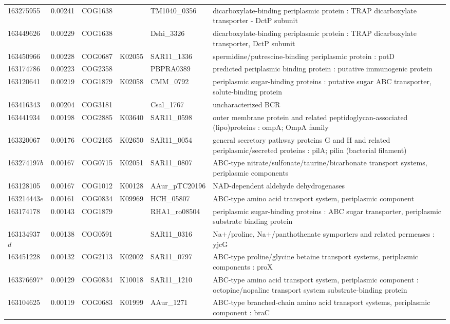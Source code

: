 \begin{landscape}
\begin{longtable}{p{1.8cm}p{0.9cm}p{2.2cm}p{1cm}p{2.8cm}p{13.4cm}}
163275955&0.00241&COG1638&&TM1040\_0356&dicarboxylate-binding periplasmic protein : TRAP dicarboxylate transporter - DctP subunit \\
163449626&0.00229&COG1638&&Dshi\_3326&dicarboxylate-binding periplasmic protein : TRAP dicarboxylate transporter, DctP subunit \\
163450966&0.00228&COG0687&K02055&SAR11\_1336&spermidine/putrescine-binding periplasmic protein : potD \\
163174786&0.00223&COG2358&&PBPRA0389&predicted periplasmic binding protein : putative immunogenic protein \\
163120641&0.00219&COG1879&K02058&CMM\_0792&periplasmic sugar-binding proteins : putative sugar ABC transporter, solute-binding protein \\
163416343&0.00204&COG3181&&Csal\_1767&uncharacterized BCR \\
163441934&0.00198&COG2885&K03640&SAR11\_0598&outer membrane protein and related peptidoglycan-associated (lipo)proteins : ompA; OmpA family \\
163320067&0.00176&COG2165&K02650&SAR11\_0054&general secretory pathway proteins G and H and related periplasmic/secreted proteins : pilA; pilin (bacterial filament) \\
163274197$b$&0.00167&COG0715&K02051&SAR11\_0807&ABC-type nitrate/sulfonate/taurine/bicarbonate transport systems, periplasmic components \\
163128105&0.00167&COG1012&K00128&AAur\_pTC20196&NAD-dependent aldehyde dehydrogenases \\
163214443$e$&0.00161&COG0834&K09969&HCH\_05807&ABC-type amino acid transport system, periplasmic component \\
163174178&0.00143&COG1879&&RHA1\_ro08504&periplasmic sugar-binding proteins : ABC sugar transporter, periplasmic substrate binding protein \\
163134937$d$&0.00138&COG0591&&SAR11\_0316&Na$+$/proline, Na$+$/panthothenate symporters and related permeases : yjcG \\
163451228&0.00132&COG2113&K02002&SAR11\_0797&ABC-type proline/glycine betaine transport systems, periplasmic components : proX \\
163376697*&0.00129&COG0834&K10018&SAR11\_1210&ABC-type amino acid transport system, periplasmic component : octopine/nopaline transport system  substrate-binding protein \\
163104625&0.00119&COG0683&K01999&AAur\_1271&ABC-type branched-chain amino acid transport systems, periplasmic component : braC \\

\end{longtable}
\end{landscape}
